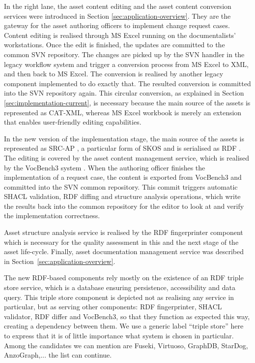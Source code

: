 	In the right lane, the asset content editing and the asset content conversion services were introduced in Section \ref{sec:application-overview}. They are the gateway for the asset authoring officers to implement change request cases. Content editing is realised through MS Excel running on the documentalists' workstations. Once the edit is finished, the updates are committed to the common SVN repository. The changes are picked up by the SVN handler in the legacy workflow system and trigger a conversion process from MS Excel to XML, and then back to MS Excel. The conversion is realised by another legacy component implemented to do exactly that. The resulted conversion is committed into the SVN repository again. This circular conversion, as explained in Section \ref{sec:implementation-current}, is necessary because the main source of the assets is represented as CAT-XML, whereas MS Excel workbook is merely an extension that enables user-friendly editing capabilities.
	
	In the new version of the implementation stage, the main source of the assets is represented as SRC-AP \cite{src-ap-vb3}, a particular form of SKOS \citep{skos-spec} and is serialised as RDF \citep{rdf11}. The editing is covered by the asset content management service, which is realised by the VocBench3 system \citep{stellatovocbench}. When the authoring officer finishes the implementation of a request case, the content is exported from VocBench3 and committed into the SVN common repository. This commit triggers automatic SHACL validation, RDF diffing and structure analysis operations, which write the results back into the common repository for the editor to look at and verify the implementation correctness. 
	
	Asset structure analysis service is realised by the RDF fingerprinter component which is necessary for the quality assessment in this and the next stage of the asset life-cycle. Finally, asset documentation management service was described in \mbox{Section \ref{sec:application-overview}.}
	
	The new RDF-based components rely mostly on the existence of an RDF triple store service, which is a database ensuring persistence, accessibility and data query. This triple store component is depicted not as realising any service in particular, but as serving other components: RDF fingerprinter, SHACL validator, RDF differ and VocBench3, so that they function as expected this way, creating a dependency between them. We use a generic label ``triple store'' here to express that it is of little importance what system is chosen in particular. Among the candidates we can mention are Fuseki, Virtuoso, GraphDB, StarDog, AnzoGraph,... the list can continue. 
	
